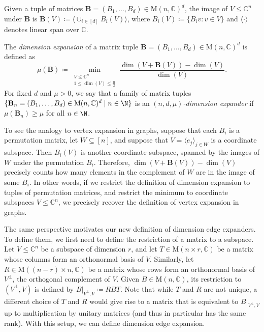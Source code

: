 \documentclass{toc}
\theoremstyle{plain}
\numberwithin{equation}{section}
\theoremstyle{definition}
\newcommand{\bC}{\mathbb{C}}
\newcommand{\M}{\mathrm{M}}
\newcommand{\tuple}[1]{\mathbf{#1}}
\newcommand{\vB}{\tuple{B}}
\begin{document}
Given a tuple of matrices $\vB=(B_1, \dots, B_d)\in \M(n, 
\bC)^d$, the image of $V\leq\bC^n$ under $\vB$ is 
$\vB(V)\coloneqq \langle \cup_{i\in[d]}B_i(V)\rangle$, where $B_i(V) \coloneqq \{B_iv:v \in V\}$ and $\langle\cdot\rangle$ denotes 
linear span over $\bC$. 
\begin{definition}
The \emph{dimension expansion} of a matrix tuple $\vB=(B_1,\dots,B_d)\in \M(n,\bC)^d$ is defined as
\begin{equation}\label{eq: dimension expansion}
    \mu(\vB)\coloneqq \min_{\substack{V\leq \bC^n \\1\leq\dim(V)\leq \frac n2}}\frac{\dim(V+\vB(V))-\dim(V)}{\dim(V)}.
\end{equation}
For fixed $d$ and $\mu >0$, we say that a family of matrix tuples $\{\vB_n=(B_1, \dots, B_d)\in \M(n, \bC)^d\mid n\in \N\}$ is an \emph{$(n,d,\mu)$-dimension expander} if $\mu(\vB_n)\geq \mu$ for all $n\in\N$. 
\end{definition}
To see the analogy to vertex expansion in graphs, suppose that each $B_i$ is a permutation matrix, let $W \subseteq [n]$, and suppose that $V = \langle e_j\rangle_{j \in W}$ is a {coordinate subspace}. Then $B_i(V)$ is another coordinate subspace, spanned by the images of $W$ under the permutation $B_i$. Therefore, $\dim(V+\vB(V))-\dim(V)$ precisely counts how many elements in the complement of $W$ are in the image of some $B_i$. In other words, if we restrict the definition of dimension expansion to tuples of permutation matrices, and restrict the minimum to {coordinate subspaces} $V \leq \bC^n$, we precisely recover the definition of vertex expansion in graphs.

The same perspective motivates our new definition of dimension edge expanders. To define them, we first need to define the restriction of a matrix to a subspace.
Let $V \leq \bC^n$ be a subspace of dimension $r$, and let $T \in \M(n\times r,\bC)$ be a matrix whose columns form an orthonormal basis of $V$. Similarly, let $R \in \M( (n-r) \times n, \bC)$ be a matrix whose rows form an orthonormal basis of $V^\perp$,
the orthogonal complement of $V$. Given $B \in \M(n,\bC)$, its restriction to $(V^\perp, V)$ is defined by $B|_{V^\perp, V}\coloneqq RBT$.
Note that while $T$ and $R$ are not unique, a different choice of $T$ and $R$ would give rise to a matrix that is equivalent to $B|_{V^\perp, V}$ up to multiplication by unitary matrices (and thus in particular has the same rank).
With this setup, we can define dimension edge expansion.
\end{document}
